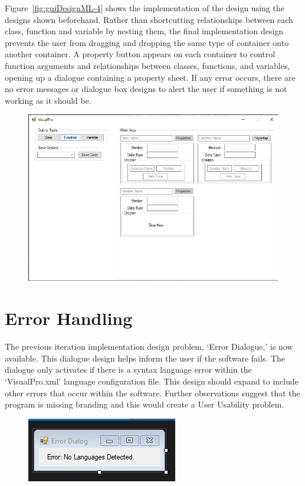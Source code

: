 \documentclass[12pt]{report} %
\begin{document}
			Figure~\ref{fig:guiDesignML-4} shows the implementation of the design using the designs shown beforehand. Rather than shortcutting relationships between each class, function and variable by nesting them, the final implementation design prevents the user from dragging and dropping the same type of container onto another container. A property button appears on each container to control function arguments and relationships between classes, functions, and variables, opening up a dialogue containing a property sheet. If any error occurs, there are no error messages or dialogue box designs to alert the user if something is not working as it should be.
			\begin{figure}[H]
				{\includegraphics[scale=0.45]{Figures/vp-designs/NET_Framework-GUI-Latest.jpg}}
			\end{figure}
		
		\section{Error Handling}
			The previous iteration implementation design problem, `Error Dialogue,' is now available. This dialogue design helps inform the user if the software fails. The dialogue only activates if there is a syntax language error within the `VisualPro.xml' language configuration file. This design should expand to include other errors that occur within the software. Further observations suggest that the program is missing branding and this would create a User Usability problem.
			\begin{figure}[H]
				{\includegraphics[scale=0.75]{Figures/vp-designs/NET_Framework-GUI-ErrorDialog.jpg}}
			\end{figure}
\end{document}
